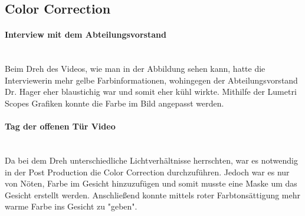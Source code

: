 \subsection{Color Correction}
\paragraph{Interview mit dem Abteilungsvorstand}
\leavevmode \\
Beim Dreh des Videos, wie man in der Abbildung sehen kann, hatte die Interviewerin mehr gelbe Farbinformationen, wohingegen der Abteilungsvorstand Dr. Hager eher blaustichig war und somit eher kühl wirkte. Mithilfe der Lumetri Scopes Grafiken konnte die Farbe im Bild angepasst werden.
\paragraph{Tag der offenen Tür Video}
\leavevmode \\
Da bei dem Dreh unterschiedliche Lichtverhältnisse herrschten, war es notwendig in der Post Production die Color Correction durchzuführen. Jedoch war es nur von Nöten, Farbe im Gesicht hinzuzufügen und somit musste eine Maske um das Gesicht erstellt werden. Anschließend konnte mittels roter Farbtonsättigung mehr warme Farbe ins Gesicht zu "geben".